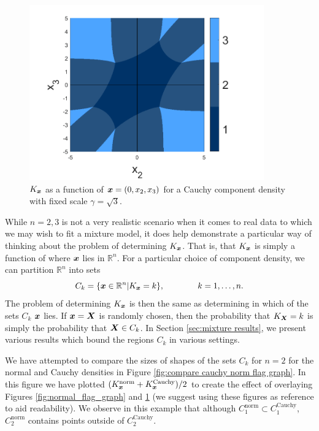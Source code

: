 	\begin{figure}
		\centering
		\includegraphics[width=0.9\textwidth]{cauchy_flag_graph.png}
		\caption{$K_{\bm{{x}}}$ as a function of ${\bm{{x}}} = (0, x_2, x_3)$ for a Cauchy component density with fixed scale $\gamma = \sqrt{3}$.}
		\label{fig:cauchy_flag_graph}
	\end{figure}
	
	While $n = 2,3$ is not a very realistic scenario when it comes to real data to which we may wish to fit a mixture model, it does help demonstrate a particular way of thinking about the problem of determining $K_{\bm{{x}}}$. That is, that $K_{\bm{{x}}}$ is simply a function of where ${\bm{{x}}}$ lies in $\mathbb{R}^n$. For a particular choice of component density, we can partition $\mathbb{R}^n$ into sets 
	\begin{equation}
		C_k = \{ {\bm{{x}}} \in \mathbb{R}^n | K_{{\bm{{x}}}} = k \}, \hspace{40pt} k = 1,\dots,n.
		\label{eq: C_k partition sets}
	\end{equation}
	The problem of determining $K_{{\bm{{x}}}}$ is then the same as determining in which of the sets $C_k$ ${\bm{{x}}}$ lies. If ${\bm{{x}}} = {\bm{{X}}}$ is randomly chosen, then the probability that $K_{\bm{{X}}} = k$ is simply the probability that ${\bm{{X}}} \in C_k$. In Section \ref{sec:mixture results}, we present various results which bound the regions $C_k$ in various settings.

	We have attempted to compare the sizes of shapes of the sets $C_k$ for $n = 2$ for the normal and Cauchy densities in Figure \ref{fig:compare cauchy norm flag graph}. In this figure we have plotted $(K_{\bm{{x}}}^\mathrm{norm} + K_{\bm{{x}}}^\mathrm{Cauchy}) / 2$ to create the effect of overlaying Figures \ref{fig:normal_flag_graph} and \ref{fig:cauchy_flag_graph} (we suggest using these figures as reference to aid readability). We observe in this example that although $C_1^\mathrm{norm} \subset C_1^\mathrm{Cauchy}$, $C_2^\mathrm{norm}$ contains points outside of $C_2^\mathrm{Cauchy}$.


